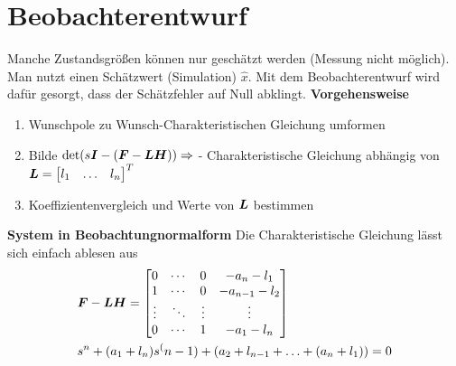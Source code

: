 \section{Beobachterentwurf}

\begin{tcolorbox}[colback=white!10!white,colframe=green!30!black] 
    Manche Zustandsgrößen können nur geschätzt werden (Messung nicht möglich). Man nutzt einen Schätzwert (Simulation) $\hat{x}$. Mit dem Beobachterentwurf wird dafür gesorgt, dass der Schätzfehler auf Null abklingt.
        \textbf{Vorgehensweise}
        \begin{enumerate}
            \item Wunschpole zu Wunsch-Charakteristischen Gleichung umformen
            \item Bilde $\det(s\boldsymbol{I}-(\boldsymbol{F}-\boldsymbol{LH}))\Rightarrow$ - Charakteristische Gleichung abhängig von $\boldsymbol{L} = \begin{bmatrix}
            l_1&\ldots&l_n
            \end{bmatrix}^T$ 
            \item Koeffizientenvergleich und Werte von $\boldsymbol{L}$ bestimmen
        \end{enumerate}
    \tcblower
\textbf{System in Beobachtungnormalform}
Die Charakteristische Gleichung lässt sich einfach ablesen aus
\begin{align*}
    &\boldsymbol{F}-\boldsymbol{LH} = 
    \begin{bmatrix}
    0 &  \cdots & 0 &-a_n-l_1\\
    1 &\cdots & 0 & -a_{n-1}-l_2 \\
    \vdots&\ddots&\vdots&\vdots\\
    0&\cdots&1&-a_1-l_n
    \end{bmatrix}    \\
    &s^n +(a_1+l_n)s^(n-1)+ (a_2+l_{n-1}+\ldots+(a_n+l_1))=0
\end{align*}


\end{tcolorbox}
